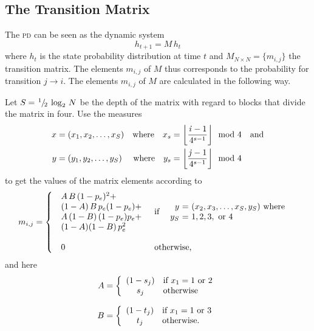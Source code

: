 \subsection{The Transition Matrix}
The \textsc{pd} can be seen as the dynamic system
\begin{equation*}
h_{t+1} = M\, h_t
\end{equation*}
where $h_t$ is the state probability distribution at time $t$ and $M_{N\times N}= \{ m_{i,j}\}$ the transition matrix. The elements $m_{i, j}$ of $M$ thus corresponds to the probability for transition $j\rightarrow i$. The elements $m_{i, j}$ of $M$ are calculated in the following way.

Let $S = \hspace{1pt} ^{1} \hspace{-0.8pt} / \hspace{-1.5pt} _{2} \hspace{2pt}\log_2\, N$ be the depth of the matrix with regard to blocks that divide the matrix in four. Use the measures
\begin{align*}
x &= (x_1, x_2, \dots, x_S) &\textrm{where} \quad x_s &= \floor{\frac{\makebox[1ex]{\textit{i}}-1}{4^{s-1}}} \mod 4 \quad \textrm{and}\\
y &= (y_1, y_2, \dots, y_S) &\textrm{where} \quad y_s &= \floor{\frac{\makebox[1ex]{\textit{j}}-1}{4^{s-1}}} \mod 4
\end{align*}
to get the values of the matrix elements according to
\begin{equation*}
m_{i, j} = \left\{
\begin{array}{ll}
\begin{array}{l}
A\,B\,(1-p_e)^2 + \\
(1 - A)\,B\, p_e(1-p_e) + \\
A\,(1-B)\,(1 - p_e)p_e + \\
(1-A)(1-B)\,p_e^2 \\[\baselineskip]
\end{array}
 & \textrm{if~}
\begin{array}{r@{~=~}l}
\quad y & (x_2, x_3, \dots, x_S, y_S) \textrm{~where~} \\
    y_S & 1, 2, 3, \textrm{~or~} 4
\end{array}
\\~\vspace{-0.5\baselineskip}~\\
\begin{array}{l}
0
\end{array}
 & \textrm{otherwise,}
\end{array}
\right.
\end{equation*}
and here
\begin{align*}
A &= \left\{%
\begin{array}{cl}%
(1-s_j) & \textrm{if~} x_1 = 1 \textrm{~or~} 2 \\
s_j & \textrm{otherwise}
\end{array}%
\right. \\[0.5\baselineskip]
B &= \left\{%
\begin{array}{cl}%
(1-t_j) & \textrm{if~} x_1 = 1 \textrm{~or~} 3 \\
t_j & \textrm{otherwise.}%
\end{array}%
\right.%
\end{align*}

